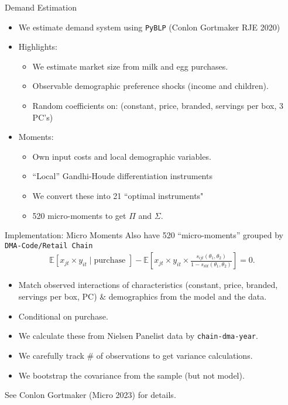 \begin{frame}[plain,label=maindemand]{Demand Estimation}
\begin{itemize}
\item We estimate demand system using \texttt{PyBLP} (Conlon Gortmaker RJE 2020)
\item Highlights:
\begin{itemize}
\item We estimate market size from milk and egg purchases.
\item Observable demographic preference shocks (income and children).
\item Random coefficients on: (constant, price, branded, servings per box, 3 PC's)
\end{itemize}
\item Moments:
\begin{itemize}
\item Own input costs and local demographic variables.
\item ``Local'' Gandhi-Houde differentiation instruments
\item We convert these into 21 ``optimal instruments"
\item 520 micro-moments to get $\Pi$ and $\Sigma$.
\end{itemize}
\end{itemize}
\end{frame}


\begin{frame}{Implementation: Micro Moments}
Also have 520 ``micro-moments'' grouped by \texttt{DMA-Code/Retail Chain}
\begin{align*}
\mathbb{E} \left[x_{jt} \times y_{it} \mid \text{purchase } \right] 
- \mathbb{E}\left[x_{jt} \times y_{it}  \times \frac{s_{ijt}(\theta_1,\theta_2)}{1-s_{i0t}(\theta_1,\theta_2)}  \right] = 0.
\end{align*}
\begin{itemize}
\item Match observed interactions of characteristics (constant, price, branded, servings per box, PC) \& demographics from the model and the data.
\item Conditional on purchase.
\item We calculate these from Nielsen Panelist data by \texttt{chain-dma-year}.
\item We carefully track \# of observations to get variance calculations.
\item We bootstrap the covariance from the sample (but not model).
\end{itemize}
See Conlon Gortmaker (Micro 2023) for details.
\end{frame}

